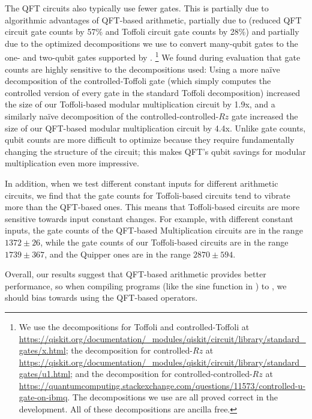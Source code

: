 The QFT circuits also typically use fewer gates. 
This is partially due to algorithmic advantages of QFT-based arithmetic, 
partially due to \voqc (\voqc reduced QFT circuit gate
counts by 57\% and Toffoli circuit gate counts by 28\%) 
and partially due to the optimized decompositions we use to convert 
many-qubit gates to the one- and two-qubit gates supported by \voqc.%
\footnote{We use the decompositions for Toffoli and controlled-Toffoli at \url{https://qiskit.org/documentation/_modules/qiskit/circuit/library/standard_gates/x.html}; the decomposition for controlled-$Rz$ at \url{https://qiskit.org/documentation/_modules/qiskit/circuit/library/standard_gates/u1.html}; and the decomposition for controlled-controlled-$Rz$ at \url{https://quantumcomputing.stackexchange.com/questions/11573/controlled-u-gate-on-ibmq}. The decompositions we use are all proved correct in the \sqir development. All of these decompositions are ancilla free.}
We found during evaluation that gate counts are highly sensitive
to the decompositions used: Using a more
na\"{i}ve decomposition of the controlled-Toffoli gate (which simply
computes the controlled version of every gate in the standard Toffoli
decomposition) increased the size of our Toffoli-based modular multiplication circuit by 1.9x, and a similarly na\"{i}ve decomposition of the controlled-controlled-$Rz$ gate increased the size of our QFT-based modular multiplication circuit by 4.4x.
Unlike gate counts, qubit counts
are more difficult to optimize because they require fundamentally
changing the structure of the circuit; this makes QFT's qubit savings
for modular multiplication even more impressive.

In addition, when we test different constant inputs for different arithmetic circuits, we find that the gate counts for Toffoli-based circuits tend to vibrate more than the QFT-based ones. This means that Toffoli-based circuits are more sensitive towards input constant changes. For example, with different constant inputs, the gate counts of the QFT-based Multiplication circuits are in the range $1372\pm 26$, while the gate counts of our Toffoli-based circuits are in the range $1739 \pm 367$, and the Quipper ones are in the range $2870 \pm 594$.

Overall, our results suggest that QFT-based arithmetic provides better performance, so when compiling \vqimp programs (like the sine function in ) to \oqasm, we should bias towards using the QFT-based operators.


